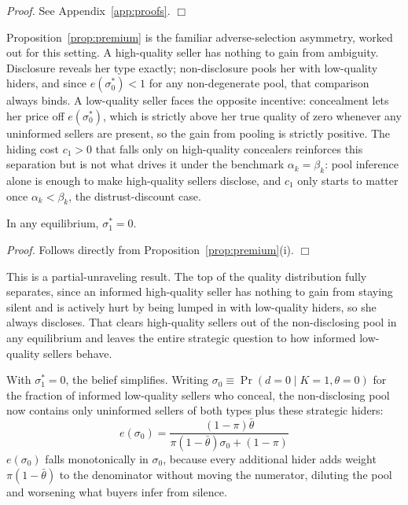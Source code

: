 \noindent\textit{Proof.} See Appendix~\ref{app:proofs}. $\Box$

Proposition~\ref{prop:premium} is the familiar adverse-selection asymmetry, worked out for this setting. A high-quality seller has nothing to gain from ambiguity. Disclosure reveals her type exactly; non-disclosure pools her with low-quality hiders, and since $e(\sigma_0^*)<1$ for any non-degenerate pool, that comparison always binds. A low-quality seller faces the opposite incentive: concealment lets her price off $e(\sigma_0^*)$, which is strictly above her true quality of zero whenever any uninformed sellers are present, so the gain from pooling is strictly positive. The hiding cost $c_1>0$ that falls only on high-quality concealers reinforces this separation but is not what drives it under the benchmark $\alpha_k=\beta_k$: pool inference alone is enough to make high-quality sellers disclose, and $c_1$ only starts to matter once $\alpha_k<\beta_k$, the distrust-discount case.

\begin{corollary}
\label{cor:hq_disclose}
In any equilibrium, $\sigma_1^*=0$.
\end{corollary}

\noindent\textit{Proof.} Follows directly from Proposition~\ref{prop:premium}(i). $\Box$

This is a partial-unraveling result. The top of the quality distribution fully separates, since an informed high-quality seller has nothing to gain from staying silent and is actively hurt by being lumped in with low-quality hiders, so she always discloses. That clears high-quality sellers out of the non-disclosing pool in any equilibrium and leaves the entire strategic question to how informed low-quality sellers behave.

With $\sigma_1^*=0$, the belief simplifies. Writing $\sigma_0\equiv\Pr(d=0\mid K=1,\theta=0)$ for the fraction of informed low-quality sellers who conceal, the non-disclosing pool now contains only uninformed sellers of both types plus these strategic hiders:
\begin{equation}
    e(\sigma_0) = \frac{(1-\pi)\bar{\theta}}{\pi(1-\bar{\theta})\sigma_0 + (1-\pi)}
    \label{eq:belief_simplified}
\end{equation}
$e(\sigma_0)$ falls monotonically in $\sigma_0$, because every additional hider adds weight $\pi(1-\bar{\theta})$ to the denominator without moving the numerator, diluting the pool and worsening what buyers infer from silence.

